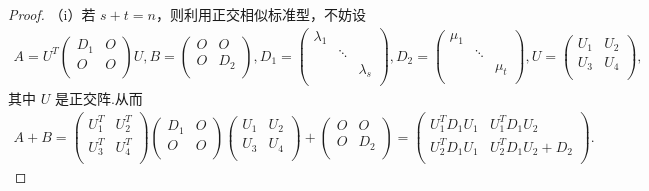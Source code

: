 \documentclass[../../main.tex]{subfiles}%
\begin{document}
\begin{proof}
（i）若 $s+t=n$，则利用正交相似标准型，不妨设
\begin{align*}
A=U^T\begin{pmatrix}
D_1&		O\\
O&		O\\
\end{pmatrix} U,B=\begin{pmatrix}
O&		O\\
O&		D_2\\
\end{pmatrix},D_1=\begin{pmatrix}
\lambda _1&		&		\\
&		\ddots&		\\
&		&		\lambda _s\\
\end{pmatrix},D_2=\begin{pmatrix}
\mu _1&		&		\\
&		\ddots&		\\
&		&		\mu _t\\
\end{pmatrix},U=\begin{pmatrix}
U_1&		U_2\\
U_3&		U_4\\
\end{pmatrix},
\end{align*}
其中 $U$ 是正交阵.从而
\begin{align*}
A+B=\begin{pmatrix}
U_{1}^{T}&		U_{2}^{T}\\
U_{3}^{T}&		U_{4}^{T}\\
\end{pmatrix} \begin{pmatrix}
D_1&		O\\
O&		O\\
\end{pmatrix} \begin{pmatrix}
U_1&		U_2\\
U_3&		U_4\\
\end{pmatrix} +\begin{pmatrix}
O&		O\\
O&		D_2\\
\end{pmatrix} =\begin{pmatrix}
U_{1}^{T}D_1U_1&		U_{1}^{T}D_1U_2\\
U_{2}^{T}D_1U_1&		U_{2}^{T}D_1U_2+D_2\\
\end{pmatrix}.
\end{align*}

\end{proof}
\end{document}
